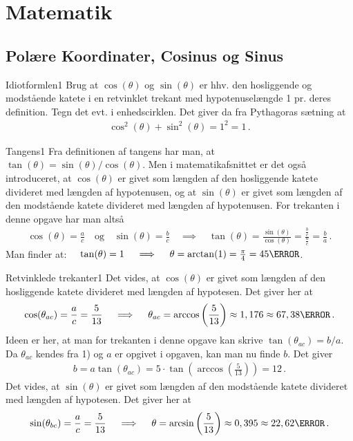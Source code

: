 \chapter{Matematik}
\section{Polære Koordinater, Cosinus og Sinus}
\begin{opgave}{Idiotformlen}{1}
Brug at $\cos(\theta) $ og $\sin(\theta) $ er hhv. den hosliggende og modstående katete i en retvinklet trekant med hypotenuselængde 1 pr. deres definition. Tegn det evt. i enhedscirklen. Det giver da fra Pythagoras sætning at
\begin{align*}
\cos^2 (\theta) + \sin^2 (\theta) = 1^2 = 1 \, .
\end{align*} 
\end{opgave}
\begin{opgave}{Tangens}{1}
\opg Fra definitionen af tangens har man, at $\tan(\theta) = \sin(\theta)/\cos(\theta)$. Men i matematikafsnittet er det også introduceret, at $\cos(\theta)$ er givet som længden af den hosliggende katete divideret med længden af hypotenusen, og at $\sin(\theta)$ er givet som længden af den modstående katete divideret med længden af hypotenusen. For trekanten i denne opgave har man altså 
\begin{align*}
\cos(\theta) = \frac{a}{c} \quad \text{og} \quad \sin(\theta) = \frac{b}{c}  \quad \implies  \quad \tan(\theta) = \frac{\sin(\theta)}{\cos(\theta)} = \frac{\frac{b}{c}}{\frac{a}{c}} = \frac{b}{a} \, . 
\end{align*}
\opg Man finder at: $\quad \tan(\theta) = 1 \quad \implies \quad \theta =  \arctan(1) = \frac{\pi}{4} = 45\degree$.
\end{opgave}
\newpage
\begin{opgave}{Retvinklede trekanter}{1}
\opg Det vides, at $\cos(\theta)$ er givet som længden af den hosliggende katete divideret med længden af hypotesen. Det giver her at
\begin{align*}
\cos(\theta_{ac}) = \frac{a}{c} = \frac{5}{13} \quad \implies \quad \theta_{ac} = \arccos \left( \frac{5}{13} \right) \approx 1,176  \approx 67,38 \degree \, .
\end{align*}
\opg Ideen er her, at man for trekanten i denne opgave kan skrive $\tan(\theta_{ac}) = b/a$. Da $\theta_{ac}$ kendes fra 1) og $a$ er opgivet i opgaven, kan man nu finde $b$. Det giver
\begin{align*}
b = a \tan(\theta_{ac}) = 5 \cdot \tan \left( \arccos \left( \frac{5}{13}  \right) \right) = 12 \, .
\end{align*}
\opg Det vides, at $\sin(\theta)$ er givet som længden af den modstående katete divideret med længden af hypotesen. Det giver her at
\begin{align*}
\sin(\theta_{bc}) = \frac{a}{c} = \frac{5}{13} \quad \implies \quad \theta = \arcsin \left( \frac{5}{13} \right) \approx 0,395 \approx 22,62 \degree \, . 
\end{align*}
\end{opgave}
